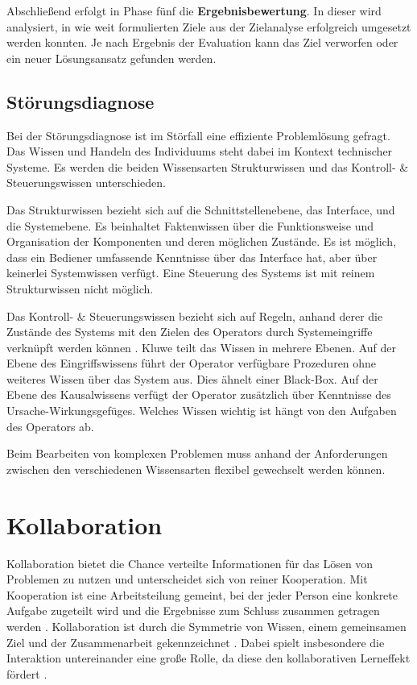 Abschließend erfolgt in Phase fünf die \textbf{Ergebnisbewertung}. In dieser wird analysiert, in wie weit formulierten Ziele aus der Zielanalyse erfolgreich umgesetzt werden konnten. Je nach Ergebnis der Evaluation kann das Ziel verworfen oder ein neuer Lösungsansatz gefunden werden.
\cite{Betsch2011}

\subsection{Störungsdiagnose}
\label{2-Störungsdiagnose}
Bei der Störungsdiagnose ist im Störfall eine effiziente Problemlösung gefragt. Das Wissen und Handeln des Individuums steht dabei im Kontext technischer Systeme. Es werden die beiden Wissensarten Strukturwissen und das Kontroll- \& Steuerungswissen unterschieden. \cite{Funke2015}

Das Strukturwissen bezieht sich auf die Schnittstellenebene, das Interface, und die Systemebene. Es beinhaltet Faktenwissen über die Funktionsweise und Organisation der Komponenten und deren möglichen Zustände. Es ist möglich, dass ein Bediener umfassende Kenntnisse über das Interface hat, aber über keinerlei Systemwissen verfügt. Eine Steuerung des Systems ist mit reinem Strukturwissen nicht möglich. \cite{Funke2015, Kluwe1997}

Das Kontroll- \& Steuerungswissen bezieht sich auf Regeln, anhand derer die Zustände des Systems mit den Zielen des Operators durch Systemeingriffe verknüpft werden können \cite{Funke2015}. Kluwe \cite{Kluwe1997} teilt das Wissen in mehrere Ebenen. Auf der Ebene des Eingriffswissens führt der Operator verfügbare Prozeduren ohne weiteres Wissen über das System aus. Dies ähnelt einer Black-Box. Auf der Ebene des Kausalwissens verfügt der Operator zusätzlich über Kenntnisse des Ursache-Wirkungsgefüges. Welches Wissen wichtig ist hängt von den Aufgaben des Operators ab.

Beim Bearbeiten von komplexen Problemen muss anhand der Anforderungen zwischen den verschiedenen Wissensarten flexibel gewechselt werden können. \cite{Funke2015}

\section{Kollaboration}
Kollaboration bietet die Chance verteilte Informationen für das Lösen von Problemen zu nutzen und unterscheidet sich von reiner Kooperation. Mit Kooperation ist eine Arbeitsteilung gemeint, bei der jeder Person eine konkrete Aufgabe zugeteilt wird und die Ergebnisse zum Schluss zusammen getragen werden \cite{Jermann2004}. Kollaboration ist durch die Symmetrie von Wissen, einem gemeinsamen Ziel und der Zusammenarbeit gekennzeichnet \cite{Rummel1958}. Dabei spielt insbesondere die Interaktion untereinander eine große Rolle, da diese den kollaborativen Lerneffekt fördert \cite{Jermann2004}.

